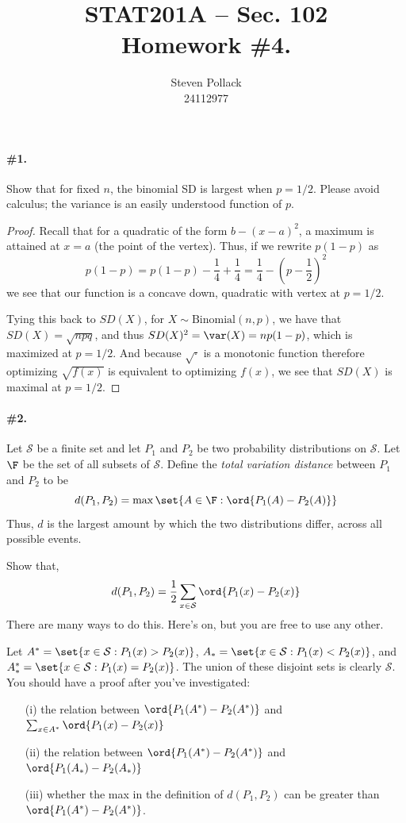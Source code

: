 \documentclass[12pt,titlepage]{article}
\title{STAT201A -- Sec. 102 \\ Homework \#4. }
\author{Steven Pollack \\ 24112977}
\date{}
\begin{document}

\maketitle

\pagestyle{empty}
\newpage
\pagestyle{fancy}

\paragraph{\#1.} Show that for fixed $n$, the binomial SD is largest when $p=1/2$. Please avoid calculus; the variance is an easily understood function of $p$. 
\begin{proof}
Recall that for a quadratic of the form $b-(x-a)^2$, a maximum is attained at $x=a$ (the point of the vertex). Thus, if we rewrite $p(1-p)$ as
\[
p(1-p) = p(1-p) - \frac{1}{4} + \frac{1}{4} = \frac{1}{4} -\left(p-\frac{1}{2}\right)^2
\]
 we see that our function is a concave down, quadratic with vertex at $p=1/2$. 

Tying this back to $SD(X)$, for $X \sim \text{Binomial}(n,p)$, we have that $SD(X) = \sqrt{npq}$, and thus $SD(X)^2 = \var(X) = np(1-p)$, which is maximized at $p=1/2$. And because $\sqrt{\cdot}$ is a monotonic function therefore optimizing $\sqrt{f(x)}$ is equivalent to optimizing $f(x)$, we see that $SD(X)$ is maximal at $p=1/2$. 
\end{proof}

\newcommand{\g}{\ord{P_{1}(A^{*})-P_{2}(A^{*})}}
\newcommand{\G}{\ord{P_{1}(A_{*})-P_{2}(A_{*})}}
\newcommand{\h}{\ord{P_{1}(B)-P_{2}(B)}}
\newcommand{\dist}{d(P_1,P_2)}
\renewcommand{\S}{\mathcal{S}}

\paragraph{\#2.} Let $\S$ be a finite set and let $P_1$ and $P_2$ be two probability distributions on $\S$. Let $\F$ be the set of all subsets of $\S$. Define the \textit{total variation distance} between $P_1$ and $P_2$ to be 
\[
\dist = \max\set{ A \in \F : \ord{P_1(A) - P_2(A)} }
\]
Thus, $d$ is the largest amount by which the two distributions differ, across all possible events. 

Show that, 
\[
\dist = \frac{1}{2}\sum_{x \in \S} \ord{P_1(x) - P_2(x)}
\]
There are many ways to do this. Here's on, but you are free to use any other.

Let $A^{*} = \set{ x \in \S : P_1(x) > P_2(x) }$, $A_{*} = \set{ x \in \S : P_1(x) < P_2(x) }$, and $A_{*}^{*} = \set{ x \in \S : P_1(x) = P_2(x)}$. The union of these disjoint sets is clearly $\S$. You should have a proof after you've investigated:
\begin{enumerate}
\item[(i)] the relation between $\g$ and $\sum_{x \in A^*} \ord{P_1(x) - P_2(x)}$
\item[(ii)] the relation between $\g$ and $\G$
\item[(iii)] whether the max in the definition of $\dist$ can be greater than $\g$. 
\end{enumerate}
\end{document}

